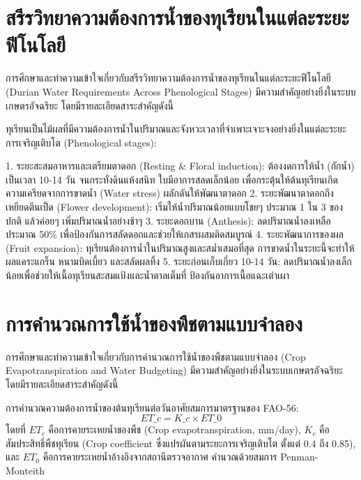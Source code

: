 
\section{สรีรวิทยาความต้องการน้ำของทุเรียนในแต่ละระยะฟีโนโลยี}

การศึกษาและทำความเข้าใจเกี่ยวกับสรีรวิทยาความต้องการน้ำของทุเรียนในแต่ละระยะฟีโนโลยี (Durian Water Requirements Across Phenological Stages) มีความสำคัญอย่างยิ่งในระบบเกษตรอัจฉริยะ โดยมีรายละเอียดสาระสำคัญดังนี้

ทุเรียนเป็นไม้ผลที่มีความต้องการน้ำในปริมาณและจังหวะเวลาที่จำเพาะเจาะจงอย่างยิ่งในแต่ละระยะการเจริญเติบโต (Phenological stages):

1. ระยะสะสมอาหารและเตรียมตาดอก (Resting \& Floral induction): ต้องงดการให้น้ำ (กักน้ำ) เป็นเวลา 10-14 วัน จนกระทั่งดินแห้งสนิท ใบมีอาการสลดเล็กน้อย เพื่อกระตุ้นให้ต้นทุเรียนเกิดความเครียดจากการขาดน้ำ (Water stress) ผลักดันให้พัฒนาตาดอก
2. ระยะพัฒนาตาดอกถึงเหยียดตีนเป็ด (Flower development): เริ่มให้น้ำปริมาณน้อยแบบโชยๆ ประมาณ 1 ใน 3 ของปกติ แล้วค่อยๆ เพิ่มปริมาณน้ำอย่างช้าๆ
3. ระยะดอกบาน (Anthesis): ลดปริมาณน้ำลงเหลือประมาณ 50\% เพื่อป้องกันการสลัดดอกและช่วยให้เกสรผสมติดสมบูรณ์
4. ระยะพัฒนาการของผล (Fruit expansion): ทุเรียนต้องการน้ำในปริมาณสูงและสม่ำเสมอที่สุด การขาดน้ำในระยะนี้จะทำให้ผลแคระแกร็น หนามบิดเบี้ยว และสลัดผลทิ้ง
5. ระยะก่อนเก็บเกี่ยว 10-14 วัน: ลดปริมาณน้ำลงเล็กน้อยเพื่อช่วยให้เนื้อทุเรียนสะสมแป้งและน้ำตาลเต็มที่ ป้องกันอาการเนื้อแฉะเต่าเผา

\section{การคำนวณการใช้น้ำของพืชตามแบบจำลอง}

การศึกษาและทำความเข้าใจเกี่ยวกับการคำนวณการใช้น้ำของพืชตามแบบจำลอง (Crop Evapotranspiration and Water Budgeting) มีความสำคัญอย่างยิ่งในระบบเกษตรอัจฉริยะ โดยมีรายละเอียดสาระสำคัญดังนี้

การคำนวณความต้องการน้ำของต้นทุเรียนต่อวันอาศัยสมการมาตรฐานของ FAO-56:
\[ ET\_c = K\_c \times ET\_0 \]
โดยที่ $ET_c$ คือการคายระเหยน้ำของพืช (Crop evapotranspiration, mm/day), $K_c$ คือสัมประสิทธิ์พืชทุเรียน (Crop coefficient ซึ่งแปรผันตามระยะการเจริญเติบโต ตั้งแต่ 0.4 ถึง 0.85), และ $ET_0$ คือการคายระเหยน้ำอ้างอิงจากสถานีตรวจอากาศ คำนวณด้วยสมการ Penman-Monteith


